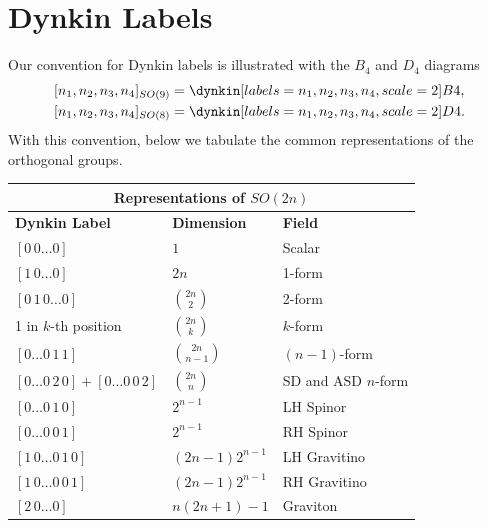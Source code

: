 \section{Dynkin Labels}
\label{sec:Dynkin Label Conventions}
Our convention for Dynkin labels is illustrated with the $B_4$ and $D_4$ diagrams
\begin{equation}
\begin{aligned}
[n_1, n_2, n_3, n_4]_{SO(9)} &= \dynkin[labels={n_1,n_2,n_3,n_4}, scale = 2]{B}{4},\\
[n_1, n_2, n_3, n_4]_{SO(8)} &= \dynkin[labels={n_1,n_2,n_3,n_4}, scale = 2]{D}{4}.
\end{aligned}
\end{equation}
With this convention, below we tabulate the common representations of the orthogonal groups.
\begin{center}
\begin{tabular}{p{} p{} p{}}
\toprule
\multicolumn{3}{c}{\textbf{Representations of } $SO(2n)$} \\
\midrule
\textbf{Dynkin Label} & \textbf{Dimension} & \textbf{Field} \\
\midrule
$[0\,0\ldots 0]$                     & $1$                    & Scalar \\
$[1\,0\ldots 0]$                     & $2n$                   & 1-form \\
$[0\,1\,0\ldots 0]$                  & $\binom{2n}{2}$        & 2-form \\
1 in $k$-th position                 & $\binom{2n}{k}$        & $k$-form \\
$[0\ldots 0\,1\,1]$                  & $\binom{2n}{n-1}$      & $(n-1)$-form \\
$[0\ldots 0\,2\,0] + [0\ldots 0\,0\,2]$
                                     & $\binom{2n}{n}$        & SD and ASD $n$-form \\
$[0\ldots 0\,1\,0]$                  & $2^{n-1}$            & LH Spinor \\
$[0\ldots 0\,0\,1]$                  & $2^{n-1}$            & RH Spinor \\
$[1\,0\ldots 0\,1\,0]$               & $(2n-1)2^{n-1}$      & LH Gravitino \\
$[1\,0\ldots 0\,0\,1]$               & $(2n-1)2^{n-1}$      & RH Gravitino \\
$[2\,0\ldots 0]$                     & $n(2n+1)-1$            & Graviton \\
\bottomrule
\end{tabular}
\end{center}

